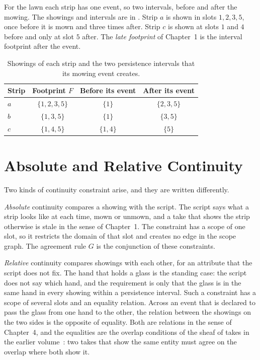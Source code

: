 \documentclass[11pt,twoside,openright]{book}
\theoremstyle{plain}
\theoremstyle{definition}
\theoremstyle{remark}
\begin{document}
For the lawn each strip has one event, so two intervals, before and after the mowing. The showings and intervals are in . Strip $a$ is shown in slots $1,2,3,5$, once before it is mown and three times after. Strip $c$ is shown at slots $1$ and $4$ before and only at slot $5$ after. The \emph{late footprint} of Chapter~1 is the interval footprint after the event.

\begin{table}[ht]
\centering
\begin{tabular}{@{}lccc@{}}
\toprule
Strip & Footprint $F$ & Before its event & After its event\\
\midrule
$a$ & $\{1,2,3,5\}$ & $\{1\}$ & $\{2,3,5\}$\\
$b$ & $\{1,3,5\}$ & $\{1\}$ & $\{3,5\}$\\
$c$ & $\{1,4,5\}$ & $\{1,4\}$ & $\{5\}$\\
\bottomrule
\end{tabular}
\caption{Showings of each strip and the two persistence intervals that its mowing event creates.}\label{tab:intervals}
\end{table}

\section{Absolute and Relative Continuity}\label{sec:kinds}

Two kinds of continuity constraint arise, and they are written differently.

\emph{Absolute} continuity compares a showing with the script. The script says what a strip looks like at each time, mown or unmown, and a take that shows the strip otherwise is stale in the sense of Chapter~1. The constraint has a scope of one slot, so it restricts the domain of that slot and creates no edge in the scope graph. The agreement rule $G$ is the conjunction of these constraints.

\emph{Relative} continuity compares showings with each other, for an attribute that the script does not fix. The hand that holds a glass is the standing case: the script does not say which hand, and the requirement is only that the glass is in the same hand in every showing within a persistence interval. Such a constraint has a scope of several slots and an equality relation. Across an event that is declared to pass the glass from one hand to the other, the relation between the showings on the two sides is the opposite of equality. Both are relations in the sense of Chapter~4, and the equalities are the overlap conditions of the sheaf of takes in the earlier volume~\cite{flyxion2026gf}: two takes that show the same entity must agree on the overlap where both show it.
\end{document}
